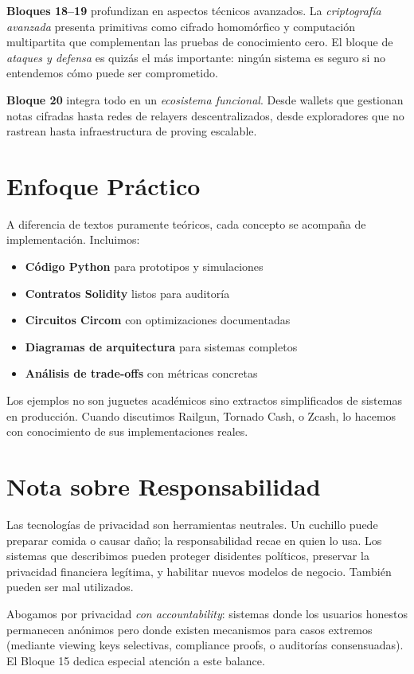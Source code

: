 \documentclass[11pt,a4paper,twoside]{book}
\theoremstyle{definition}
\theoremstyle{remark}
\begin{document}
\textbf{Bloques 18--19} profundizan en aspectos técnicos avanzados. La \textit{criptografía avanzada} presenta primitivas como cifrado homomórfico y computación multipartita que complementan las pruebas de conocimiento cero. El bloque de \textit{ataques y defensa} es quizás el más importante: ningún sistema es seguro si no entendemos cómo puede ser comprometido.

\textbf{Bloque 20} integra todo en un \textit{ecosistema funcional}. Desde wallets que gestionan notas cifradas hasta redes de relayers descentralizados, desde exploradores que no rastrean hasta infraestructura de proving escalable.

\section*{Enfoque Práctico}

A diferencia de textos puramente teóricos, cada concepto se acompaña de implementación. Incluimos:

\begin{itemize}
    \item \textbf{Código Python} para prototipos y simulaciones
    \item \textbf{Contratos Solidity} listos para auditoría
    \item \textbf{Circuitos Circom} con optimizaciones documentadas
    \item \textbf{Diagramas de arquitectura} para sistemas completos
    \item \textbf{Análisis de trade-offs} con métricas concretas
\end{itemize}

Los ejemplos no son juguetes académicos sino extractos simplificados de sistemas en producción. Cuando discutimos Railgun, Tornado Cash, o Zcash, lo hacemos con conocimiento de sus implementaciones reales.

\section*{Nota sobre Responsabilidad}

Las tecnologías de privacidad son herramientas neutrales. Un cuchillo puede preparar comida o causar daño; la responsabilidad recae en quien lo usa. Los sistemas que describimos pueden proteger disidentes políticos, preservar la privacidad financiera legítima, y habilitar nuevos modelos de negocio. También pueden ser mal utilizados.

Abogamos por privacidad \textit{con accountability}: sistemas donde los usuarios honestos permanecen anónimos pero donde existen mecanismos para casos extremos (mediante viewing keys selectivas, compliance proofs, o auditorías consensuadas). El Bloque 15 dedica especial atención a este balance.
\end{document}

